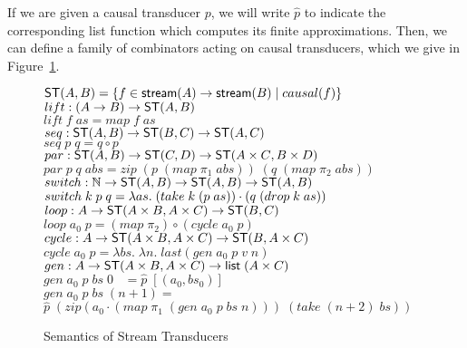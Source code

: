If we are given a causal transducer $p$, we will write $\hat{p}$ to
indicate the corresponding list function which computes its finite
approximations. Then, we can define a family of combinators acting on
causal transducers, which we give in Figure~\ref{transducer-semantics}.

\begin{figure}
\mbox{}
\begin{tabbing}
$\mathsf{ST}({A}, {B}) = \{{{f \in \mathsf{stream}({A}) \to \mathsf{stream}({B})}\;|\;{causal(f)}}\}$\\[1em]

$lift : (A \to B) \to \mathsf{ST}({A}, {B})$ \\
$lift\;f\;as = map\;f\;as$ \\[1em]

$seq  : \mathsf{ST}({A}, {B}) \to \mathsf{ST}({B}, {C}) \to \mathsf{ST}({A}, {C})$ \\
$seq\;p\;q = q \circ p$ \\[1em]

$par  : \mathsf{ST}({A}, {B}) \to \mathsf{ST}({C}, {D}) \to \mathsf{ST}({A \times C}, {B \times D})$ \\
$par\; p\;q\;abs = zip\; (p\;(map\;\pi_1\;abs))\;(q\;(map\;\pi_2\;abs))$\\[1em]

$switch : \mathbb{N} \to \mathsf{ST}({A}, {B}) \to \mathsf{ST}({A}, {B}) \to \mathsf{ST}({A}, {B})$ \\
$switch\;k\;p\;q = \lambda as.\;(take\;k\;(p\;as))\cdot(q\;(drop\;k\;as))$ \\[1em]

$loop : A \to \mathsf{ST}({A\times B}, {A \times C}) \to \mathsf{ST}({B}, {C})$ \\
$loop\;a_0\;p = (map\;\pi_2) \circ (cycle\;a_0\;p)$ \\[1em]

$cycle : A \to \mathsf{ST}({A\times B}, {A \times C}) \to \mathsf{ST}({B}, {A \times C})$ \\
$cycle\;a_0\;p = \lambda bs.\;\lambda n.\;last(gen\;a_0\;p\;v\;n)$ \\[1em]

$gen : A \to \mathsf{ST}({A\times B}, {A \times C}) \to \mathsf{list}\;{(A \times C)}$\\
$gen\;a_0\;p\;bs\;0 \;\;\; = \hat{p}\; [(a_0, bs_0)]$ \\
$gen\;a_0\;p\;bs\;(n+1) = $ \\
\;\;$\hat{p}\;(zip (a_0 \cdot (map\;\pi_1\;(gen\;a_0\;p\;bs\;n)))\;
                                        (take\;(n+2)\;bs))$ 
\end{tabbing}
\caption{Semantics of Stream Transducers}
\label{transducer-semantics}
\end{figure}

